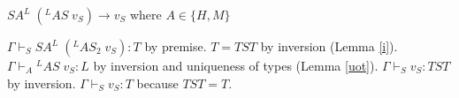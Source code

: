 \begin{case}
$SA^{L}\;(^{L}AS\;v_{S})\rightarrow v_{S}$ where $A\in\lbrace H,M\rbrace$

$\Gamma\vdash_{S}SA^{L}\;(^{L}AS_{2}\;v_{S}):T$ by premise.  $T=TST$ by inversion (Lemma \ref{i}).  $\Gamma\vdash_{A}{^{L}A}S\;v_{S}:L$ by inversion and uniqueness of types (Lemma \ref{uot}).  $\Gamma\vdash_{S}v_{S}:TST$ by inversion.  $\Gamma\vdash_{S}v_{S}:T$ because $TST=T$.
\end{case}